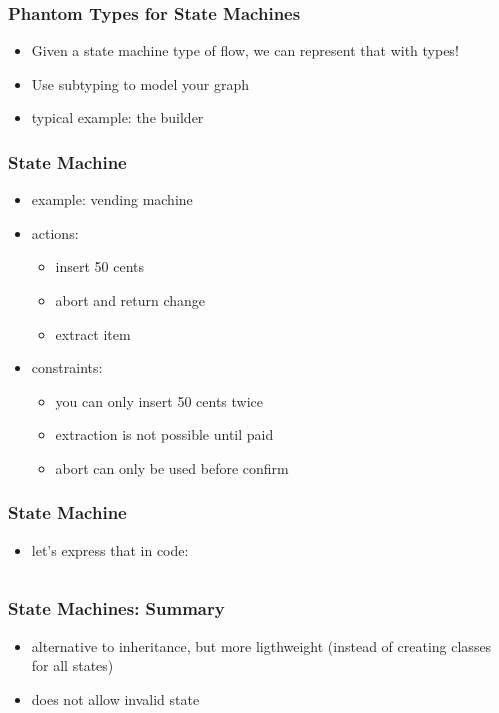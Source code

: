 \documentclass{beamer}
\begin{document}
\begin{frame}
  \frametitle{Phantom Types for State Machines}
  \begin{itemize}
  \item Given a state machine type of flow, we can represent that with
    types!
  \item Use subtyping to model your graph
  \item typical example: the builder
  \end{itemize}
\end{frame}

\begin{frame}
  \frametitle{State Machine}
  \begin{itemize}
  \item example: vending machine
  \item actions:
    \begin{itemize}
    \item insert 50 cents
    \item abort and return change
    \item extract item
    \end{itemize}
  \item constraints:
    \begin{itemize}
    \item you can only insert 50 cents twice
    \item extraction is not possible until paid
    \item abort can only be used before confirm
    \end{itemize}
  \end{itemize}
\end{frame}

\begin{frame}[fragile]
  \frametitle{State Machine}
  \begin{itemize}
  \item let's express that in code:
  \end{itemize}

\begin{verbatim}

\end{verbatim}
\end{frame}

\begin{frame}
  \frametitle{State Machines: Summary}
  \begin{itemize}
  \item alternative to inheritance, but more ligthweight (instead of
    creating classes for all states)
  \item does not allow invalid state
  \end{itemize}
\end{frame}
\end{document}
